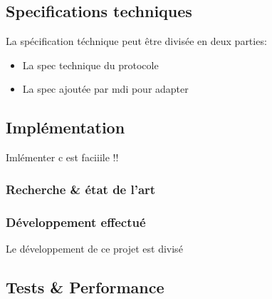        

    \subsection{Specifications techniques}
        La spécification téchnique peut être divisée en deux parties:
        \begin{itemize}
            \renewcommand{\labelitemi}{$\bullet$}
            \item La spec technique du protocole
            \item La spec ajoutée par \gls{mdi} pour adapter
        \end{itemize}
        \bigskip
       

    \subsection{Implémentation}
    Imlémenter c est faciiile !! 
        \subsubsection{Recherche \& état de l'art}
            

           
        \pagebreak

        \subsubsection{Développement effectué}
            Le développement de ce projet est divisé 

    \subsection{Tests \& Performance}
       

